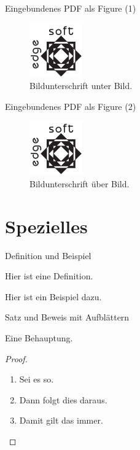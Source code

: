 \documentclass[t, aspectratio=169, ngerman]{beamer}
\begin{document}
	\begin{frame}{Eingebundenes PDF als Figure (1)}
		\begin{figure}
			\includegraphics{testlogo}
			\caption{Bildunterschrift unter Bild.}
		\end{figure}
	\end{frame}

	\begin{frame}{Eingebundenes PDF als Figure (2)}
		\begin{figure}
			\caption{Bildunterschrift über Bild.}
			\includegraphics{testlogo}
		\end{figure}
	\end{frame}

	\section{Spezielles}

	\begin{frame}{Definition und Beispiel}
		\begin{definition}
			Hier ist eine Definition.
		\end{definition}
		\begin{example}
			Hier ist ein Beispiel dazu.
		\end{example}
	\end{frame}

	\begin{frame}{Satz und Beweis mit Aufblättern}
		\begin{theorem}
			Eine Behauptung.
		\end{theorem}
		\begin{proof}
			\begin{enumerate}
				\item<1-> Sei es so.
				\item<2-> Dann folgt dies daraus.
				\item<1-> Damit gilt das immer.\qedhere
			\end{enumerate}
		\end{proof}
	\end{frame}
\end{document}
